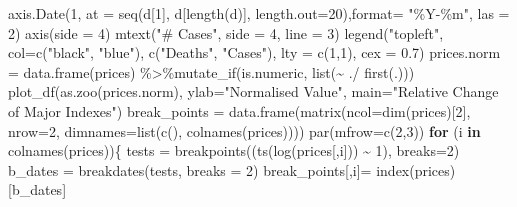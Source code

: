 \documentclass[
  11pt,
]{article}
\newenvironment{Shaded}{\begin{snugshade}}{\end{snugshade}}
\newcommand{\AttributeTok}[1]{\textcolor[rgb]{0.77,0.63,0.00}{#1}}
\newcommand{\ControlFlowTok}[1]{\textcolor[rgb]{0.13,0.29,0.53}{\textbf{#1}}}
\newcommand{\DecValTok}[1]{\textcolor[rgb]{0.00,0.00,0.81}{#1}}
\newcommand{\FloatTok}[1]{\textcolor[rgb]{0.00,0.00,0.81}{#1}}
\newcommand{\FunctionTok}[1]{\textcolor[rgb]{0.00,0.00,0.00}{#1}}
\newcommand{\NormalTok}[1]{#1}
\newcommand{\OtherTok}[1]{\textcolor[rgb]{0.56,0.35,0.01}{#1}}
\newcommand{\SpecialCharTok}[1]{\textcolor[rgb]{0.00,0.00,0.00}{#1}}
\newcommand{\StringTok}[1]{\textcolor[rgb]{0.31,0.60,0.02}{#1}}
\begin{document}
\begin{Shaded}
\begin{Highlighting}[]
\FunctionTok{axis.Date}\NormalTok{(}\DecValTok{1}\NormalTok{, }\AttributeTok{at =} \FunctionTok{seq}\NormalTok{(d[}\DecValTok{1}\NormalTok{], d[}\FunctionTok{length}\NormalTok{(d)], }\AttributeTok{length.out=}\DecValTok{20}\NormalTok{),}\AttributeTok{format=} \StringTok{"\%Y{-}\%m"}\NormalTok{, }\AttributeTok{las =} \DecValTok{2}\NormalTok{)}
\FunctionTok{axis}\NormalTok{(}\AttributeTok{side =} \DecValTok{4}\NormalTok{)}
\FunctionTok{mtext}\NormalTok{(}\StringTok{"\# Cases"}\NormalTok{, }\AttributeTok{side =} \DecValTok{4}\NormalTok{, }\AttributeTok{line =} \DecValTok{3}\NormalTok{)}
\FunctionTok{legend}\NormalTok{(}\StringTok{"topleft"}\NormalTok{, }\AttributeTok{col=}\FunctionTok{c}\NormalTok{(}\StringTok{"black"}\NormalTok{, }\StringTok{"blue"}\NormalTok{), }\FunctionTok{c}\NormalTok{(}\StringTok{"Deaths"}\NormalTok{, }\StringTok{"Cases"}\NormalTok{), }\AttributeTok{lty =} \FunctionTok{c}\NormalTok{(}\DecValTok{1}\NormalTok{,}\DecValTok{1}\NormalTok{), }\AttributeTok{cex =} \FloatTok{0.7}\NormalTok{)}
\NormalTok{prices.norm }\OtherTok{=} \FunctionTok{data.frame}\NormalTok{(prices) }\SpecialCharTok{\%\textgreater{}\%}\FunctionTok{mutate\_if}\NormalTok{(is.numeric, }\FunctionTok{list}\NormalTok{(}\SpecialCharTok{\textasciitilde{}}\NormalTok{ .}\SpecialCharTok{/} \FunctionTok{first}\NormalTok{(.)))}
\FunctionTok{plot\_df}\NormalTok{(}\FunctionTok{as.zoo}\NormalTok{(prices.norm), }\AttributeTok{ylab=}\StringTok{"Normalised Value"}\NormalTok{, }\AttributeTok{main=}\StringTok{"Relative Change of Major Indexes"}\NormalTok{)}
\NormalTok{break\_points }\OtherTok{=} \FunctionTok{data.frame}\NormalTok{(}\FunctionTok{matrix}\NormalTok{(}\AttributeTok{ncol=}\FunctionTok{dim}\NormalTok{(prices)[}\DecValTok{2}\NormalTok{], }\AttributeTok{nrow=}\DecValTok{2}\NormalTok{, }
                                 \AttributeTok{dimnames=}\FunctionTok{list}\NormalTok{(}\FunctionTok{c}\NormalTok{(), }\FunctionTok{colnames}\NormalTok{(prices))))}
\FunctionTok{par}\NormalTok{(}\AttributeTok{mfrow=}\FunctionTok{c}\NormalTok{(}\DecValTok{2}\NormalTok{,}\DecValTok{3}\NormalTok{))}
\ControlFlowTok{for}\NormalTok{ (i }\ControlFlowTok{in} \FunctionTok{colnames}\NormalTok{(prices))\{}
\NormalTok{tests }\OtherTok{=} \FunctionTok{breakpoints}\NormalTok{((}\FunctionTok{ts}\NormalTok{(}\FunctionTok{log}\NormalTok{(prices[,i])) }\SpecialCharTok{\textasciitilde{}} \DecValTok{1}\NormalTok{), }\AttributeTok{breaks=}\DecValTok{2}\NormalTok{)}
\NormalTok{b\_dates }\OtherTok{=} \FunctionTok{breakdates}\NormalTok{(tests, }\AttributeTok{breaks =} \DecValTok{2}\NormalTok{)}
\NormalTok{break\_points[,i]}\OtherTok{=} \FunctionTok{index}\NormalTok{(prices)[b\_dates]}

\end{Highlighting}
\end{Shaded}
\end{document}

